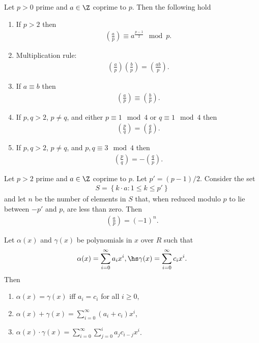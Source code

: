 \documentclass{article}
\begin{document}
\begin{theorem}[Lecture 11]
	Let $p>0$ prime and $a\in\Z$ coprime to $p$. Then the following hold
	\begin{enumerate}
		\item If $p>2$ then \begin{align*}
			      \left(\frac{a}{p}\right)\equiv a^{\frac{p-1}{2}} \mod p.
		      \end{align*}
		\item Multiplication rule: \begin{align*}
			      \left(\frac{a}{p}\right)\left(\frac{b}{p}\right)=\left(\frac{ab}{p}\right).
		      \end{align*}
		\item If $a\equiv b$ then \begin{align*}
			      \left(\frac{a}{p}\right)\equiv\left(\frac{b}{p}\right).
		      \end{align*}
		\item If $p,q>2$, $p\not=q$, and either $p\equiv 1\mod 4$ or $q\equiv 1\mod 4$ then \begin{align*}
			      \left(\frac{p}{q}\right)=\left(\frac{q}{p}\right).
		      \end{align*}
		\item If $p,q>2$, $p\not=q$, and $p,q\equiv 3\mod 4$ then \begin{align*}
			      \left(\frac{p}{q}\right)=-\left(\frac{q}{p}\right).
		      \end{align*}
	\end{enumerate}
\end{theorem}

\begin{lemma}[Gauss]
	Let $p>2$ prime and $a\in\Z$ coprime to $p$. Let $p'=(p-1)/2$. Consider the set
	\begin{align*}
		S=\left\lbrace k\cdot a : 1\leq k\leq p'\right\rbrace
	\end{align*}
	and let $n$ be the number of elements in $S$ that, when reduced modulo $p$ to lie between
	$-p'$ and $p$, are less than zero. Then
	\begin{align*}
		\left(\frac{a}{p}\right)=(-1)^n.
	\end{align*}
\end{lemma}

\begin{definition}
	Let $\alpha(x)$ and $\gamma(x)$ be polynomials in $x$ over $R$ such that
	\begin{align*}
		\alpha(x)=\sum_{i=0}^\infty a_ix^i,\hs
		\gamma(x)=\sum_{i=0}^\infty c_ix^i.
	\end{align*}
	Then \begin{enumerate}
		\item $\alpha(x)=\gamma(x)$ iff $a_i=c_i$ for all $i\geq 0$,
		\item $\alpha(x)+\gamma(x)=\sum_{i=0}^\infty (a_i+c_i)x^i$,
		\item $\alpha(x)\cdot\gamma(x)=\sum_{i=0}^\infty \sum_{j=0}^i a_jc_{i-j}x^i$.
	\end{enumerate}
\end{definition}
\end{document}
